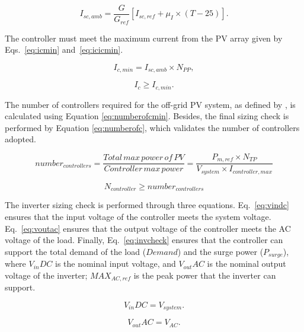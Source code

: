 \begin{equation}
\label{eq:iscamb}
I_{sc,amb} = \dfrac{G}{G_{ref}} \left[ I_{sc,ref} + \mu_{I} \times (T-25) \right]. 
\end{equation}

The controller must meet the maximum current from the PV array given by Eqs.~\eqref{eq:icmin} and~\eqref{eq:icicmin}.

\begin{equation}
\label{eq:icmin}
I_{c,min} = I_{sc,amb} \times N_{PP},
\end{equation}

\begin{equation}
\label{eq:icicmin}
I_{c} \geq I_{c,min}.
\end{equation}

The number of controllers required for the off-grid PV system, as defined by \cite{Yatimi}, is calculated using Equation \ref{eq:numberofcmin}. Besides, the final sizing check is performed by Equation \ref{eq:numberofc}, which validates the number of controllers adopted.

\begin{equation}
\label{eq:numberofcmin}
number_{controllers} = \dfrac{Total \, max \, power \, of \, PV}{Controller \, max \, power} = \dfrac{P_{m,ref} \times N_{TP}}{V_{system} \times I_{controller,max}}
\end{equation}

\begin{equation}
\label{eq:numberofc}
N_{controller} \geq number_{controllers}
\end{equation}

The inverter sizing check is performed through three equations. Eq.~\eqref{eq:vindc} ensures that the input voltage of the controller meets the system voltage. Eq.~\eqref{eq:voutac} ensures that the output voltage of the controller meets the AC voltage of the load. Finally, Eq.~\eqref{eq:invcheck} ensures that the controller can support the total demand of the load ($Demand$) and the surge power ($P_{surge}$), where $V_{in}DC$ is the nominal input voltage, and $V_{out}AC$ is the nominal output voltage of the inverter; $MAX_{AC,ref}$ is the peak power that the inverter can support.

\begin{equation}
\label{eq:vindc} 
V_{in}DC = V_{system}.
\end{equation}

\begin{equation}
\label{eq:voutac} 
V_{out}AC = V_{AC}.
\end{equation}


